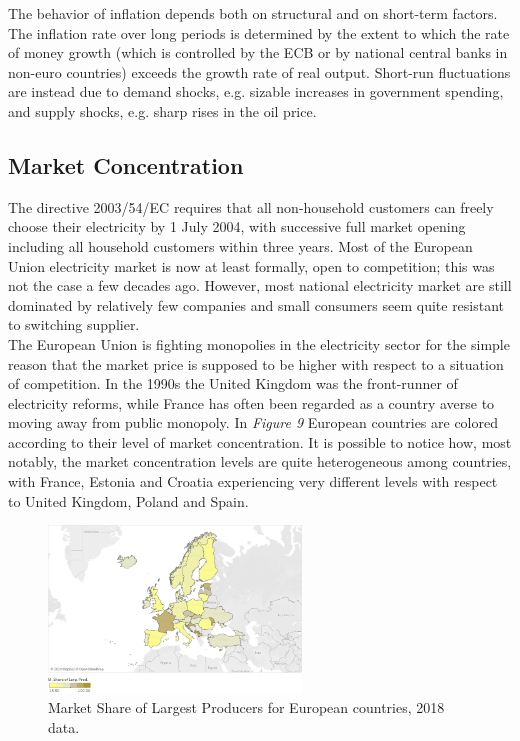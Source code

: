 \documentclass{book}
\begin{document}
The behavior of inflation depends both on structural and on short-term factors. The inflation rate over long periods is determined by the extent to which the rate of money growth (which is controlled by the ECB or by national central banks in non-euro countries) exceeds the growth rate of real output. Short-run fluctuations are instead due to demand shocks, e.g. sizable increases in government spending, and supply shocks, e.g. sharp rises in the oil price. \cite{ball1993causes}

\subsection*{Market Concentration}

The directive 2003/54/EC requires that all non-household customers can freely choose their electricity by 1 July 2004, with successive full market opening including all household customers within three years. Most of the European Union electricity market is now at least formally, open to competition; this was not the case a few decades ago. However, most national electricity market are still dominated by relatively few companies and small consumers seem quite resistant to switching supplier. \cite{jamasb2005electricity} \\

The European Union is fighting monopolies in the electricity sector for the simple reason that the market price is supposed to be higher with respect to a situation of competition. In the 1990s the United Kingdom was the front-runner of electricity reforms, while France has often been regarded as a country averse to moving away from public monopoly. \cite{fiorio2009reform} In \textit{Figure 9} European countries are colored according to their level of market concentration. It is possible to notice how, most notably, the market concentration levels are quite heterogeneous among countries, with France, Estonia and Croatia experiencing very different levels with respect to United Kingdom, Poland and Spain. 

\bigskip
\begin{figure}[H]
\begin{center}
\captionsetup{justification=centering}
\includegraphics[width=0.6\textwidth]{Images/conc.png}
\caption{Market Share of Largest Producers for European countries, 2018 data. }
\end{center}
\end{figure}
\bigskip
\end{document}
